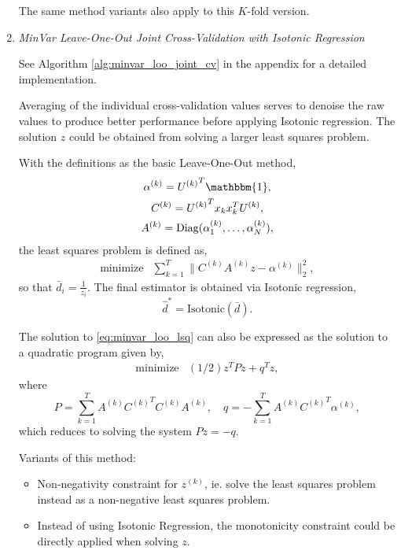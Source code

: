 \documentclass{article}
\begin{document}
\begin{enumerate}
The same method variants also apply to this $K$-fold version.

\item \emph{MinVar Leave-One-Out Joint Cross-Validation with Isotonic Regression}

See Algorithm \ref{alg:minvar_loo_joint_cv} in the appendix for a detailed
implementation.

Averaging of the individual cross-validation values serves to denoise the raw
values to produce better performance before applying Isotonic regression.  The
solution $z$ could be obtained from solving a larger least squares problem.

With the definitions as the basic Leave-One-Out method,
\begin{gather*} 
	\alpha^{(k)} = {U^{(k)}}^T\mathbbm{1}, \\
	C^{(k)} = {U^{(k)}}^T x_k x_k^T U^{(k)}, \\
	A^{(k)} = \mathrm{Diag}(\alpha^{(k)}_1, \ldots, \alpha^{(k)}_N),
\end{gather*}
the least squares problem is defined as,
\begin{equation}\label{eq:minvar_loo_lsq}
	\begin{array}{ll}
		\mbox{minimize} & \sum_{k=1}^T \| C^{(k)} A^{(k)} z - \alpha^{(k)} \|_2^2,
	\end{array}
\end{equation}
so that $\bar{d}_i = \frac{1}{z_i}$.  The final estimator is obtained via
Isotonic regression,
$$
	\hat{d}^* = \mathrm{Isotonic}(\bar{d}).
$$


The solution to \eqref{eq:minvar_loo_lsq} can also be expressed as the solution
to a quadratic program given by,
\begin{equation}\label{eq:minvar_loo_qp}
	\begin{array}{ll}
		\mbox{minimize} & (1/2) z^T P z + q^T z,
	\end{array}
\end{equation}
where
$$
	P = \sum_{k=1}^T A^{(k)} {C^{(k)}}^T C^{(k)} A^{(k)},
	\quad q = -\sum_{k=1}^T A^{(k)} {C^{(k)}}^T \alpha^{(k)},
$$
which reduces to solving the system $Pz = -q$.


Variants of this method:
\begin{itemize}
	\item Non-negativity constraint for $z^{(k)}$, ie. solve the least squares
	problem instead as a non-negative least squares problem.
	
	\item Instead of using Isotonic Regression, the monotonicity constraint could
	be directly applied when solving $z$.
	

\end{itemize}
\end{enumerate}
\end{document}
